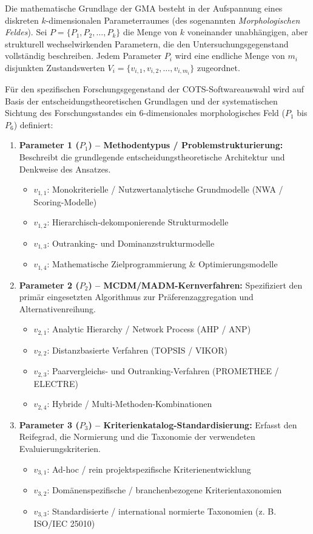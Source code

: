 Die mathematische Grundlage der GMA besteht in der Aufspannung eines diskreten $k$-dimensionalen Parameterraumes (des sogenannten \textit{Morphologischen Feldes}). Sei $P = \{P_1, P_2, \dots, P_k\}$ die Menge von $k$ voneinander unabhängigen, aber strukturell wechselwirkenden Parametern, die den Untersuchungsgegenstand vollständig beschreiben. Jedem Parameter $P_i$ wird eine endliche Menge von $m_i$ disjunkten Zustandswerten $V_i = \{v_{i,1}, v_{i,2}, \dots, v_{i,m_i}\}$ zugeordnet. 

Für den spezifischen Forschungsgegenstand der COTS-Softwareauswahl wird auf Basis der entscheidungstheoretischen Grundlagen und der systematischen Sichtung des Forschungsstandes ein 6-dimensionales morphologisches Feld ($P_1$ bis $P_6$) definiert:

\begin{enumerate}
    \item \textbf{Parameter 1 ($P_1$) -- Methodentypus / Problemstrukturierung:} Beschreibt die grundlegende entscheidungstheoretische Architektur und Denkweise des Ansatzes.
    \begin{itemize}
        \item $v_{1,1}$: Monokriterielle / Nutzwertanalytische Grundmodelle (NWA / Scoring-Modelle)
        \item $v_{1,2}$: Hierarchisch-dekomponierende Strukturmodelle
        \item $v_{1,3}$: Outranking- und Dominanzstrukturmodelle
        \item $v_{1,4}$: Mathematische Zielprogrammierung \& Optimierungsmodelle
    \end{itemize}

    \item \textbf{Parameter 2 ($P_2$) -- MCDM/MADM-Kernverfahren:} Spezifiziert den primär eingesetzten Algorithmus zur Präferenzaggregation und Alternativenreihung.
    \begin{itemize}
        \item $v_{2,1}$: Analytic Hierarchy / Network Process (AHP / ANP)
        \item $v_{2,2}$: Distanzbasierte Verfahren (TOPSIS / VIKOR)
        \item $v_{2,3}$: Paarvergleichs- und Outranking-Verfahren (PROMETHEE / ELECTRE)
        \item $v_{2,4}$: Hybride / Multi-Methoden-Kombinationen
    \end{itemize}

    \item \textbf{Parameter 3 ($P_3$) -- Kriterienkatalog-Standardisierung:} Erfasst den Reifegrad, die Normierung und die Taxonomie der verwendeten Evaluierungskriterien.
    \begin{itemize}
        \item $v_{3,1}$: Ad-hoc / rein projektspezifische Kriterienentwicklung
        \item $v_{3,2}$: Domänenspezifische / branchenbezogene Kriterientaxonomien
        \item $v_{3,3}$: Standardisierte / international normierte Taxonomien (z. B. ISO/IEC 25010)
    \end{itemize}


\end{enumerate}
